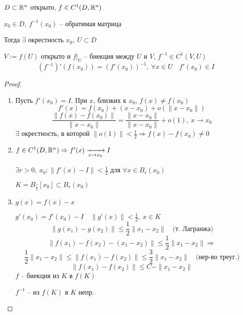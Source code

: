     \begin{theorem}
        $D \subset \mathbb{R}^n$ открыто, $f \in C^1(D, \mathbb{R}^n)$
        \par $x_0 \in D, \ f^{-1}(x_0)$ -- обратимая матрица
        \par Тогда $\exists$ окрестность $x_0, \> U \subset D$
        \par $V := f(U)$ открыто и $f\big|_U$ -- биекция между $U$ и $V$, $f^{-1} \in C^1(V, U)$
        \[
            (f^{-1})'(f(x_0)) = (f'(x_0))^{-1}, \ \forall x \in U \quad f'(x_0) \in I    
        \]
    \end{theorem}

    \begin{proof}
        $ $ \par
        \begin{enumerate}
            \item Пусть $f'(x_0) = I$. При $x$, близких к $x_0$, $f(x) \not= f(x_0)$
                \[
                    f'(x) = f(x_0) + (x-x_0) + o(\|x-x_0\|)    
                \]
                \[
                    \frac{\|f(x)-f(x_0)\|}{\| x-x_0 \|} = \frac{\|x-x_0\|}{\|x-x_0\|} + o(1), \ x \rightarrow x_0  
                \]
                $\exists$ окрестность, в которой $\|o(1)\| < \frac12 \Rightarrow f(x)-f(x_0) \not= 0$
            \item $f \in C^1(D, \mathbb{R}^n) \Rightarrow f'(x) \xrightarrow[x \rightarrow x_0]{} I$
                \par $\exists r > 0, \ x_0 : \|f'(x) - I\| < \frac12$ для $\forall x \in B_r(x_0)$
                \par $K = B_{\frac{r}{2}}[x_0] \subset B_r(x_0)$
            \item $g(x) = f(x) - x$
                \par $g'(x_0) = f'(x_0) - I \quad \|g'(x)\| < \frac12, \ x \in K$
                \[
                    \|g(x_1) - g(x_2)\| \le \frac12 \|x_1-x_2\| \quad \text{(т. Лагранжа)}
                \]
                \[
                    \|f(x_1) - f(x_2) - (x_1 - x_2)\| 
                    \le \frac12 \|x_1 - x_2\| \Rightarrow 
                \]
                \[
                    \frac12 \|x_1 - x_2\| \le \|f(x_1) - f(x_2)\| 
                    \le \frac32 \|x_1 - x_2\| \quad \text{(нер-во треуг.)}   
                \]
                \[
                    \|f(x_1) - f(x_2)\| \le C - \|x_1 - x_2\|    
                \]
                $f$ -- биекция из $K$ в $f(K)$
                \par $f^{-1}$ -- из $f(K)$ в $K$ непр.

\end{enumerate}
\end{proof}
